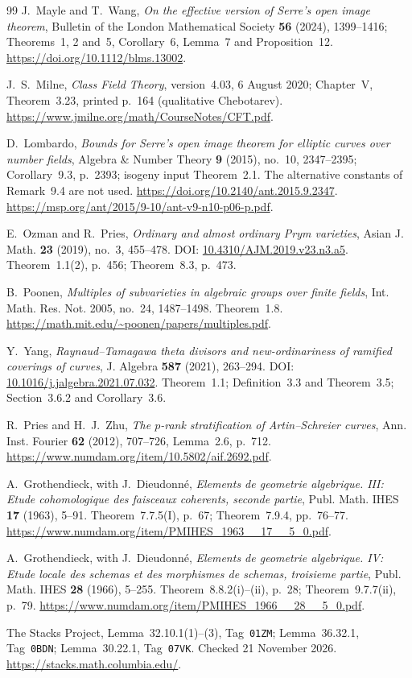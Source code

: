 \begin{thebibliography}{99}
J.~Mayle and T.~Wang, \emph{On the effective version of Serre's
open image theorem}, Bulletin of the London Mathematical Society
\textbf{56} (2024), 1399--1416; Theorems~1, 2 and~5,
Corollary~6, Lemma~7 and Proposition~12.
\url{https://doi.org/10.1112/blms.13002}.

J.~S.~Milne, \emph{Class Field Theory}, version~4.03,
6 August 2020; Chapter~V, Theorem~3.23, printed p.~164
(qualitative Chebotarev).
\url{https://www.jmilne.org/math/CourseNotes/CFT.pdf}.

D.~Lombardo, \emph{Bounds for Serre's open image theorem for elliptic
curves over number fields}, Algebra \& Number Theory \textbf{9}
(2015), no.~10, 2347--2395; Corollary~9.3, p.~2393;
isogeny input Theorem~2.1. The alternative constants of Remark~9.4
are not used.
\url{https://doi.org/10.2140/ant.2015.9.2347}.
\url{https://msp.org/ant/2015/9-10/ant-v9-n10-p06-p.pdf}.

E.~Ozman and R.~Pries,
\emph{Ordinary and almost ordinary Prym varieties},
Asian J. Math. \textbf{23} (2019), no.~3, 455--478.
DOI: \href{https://doi.org/10.4310/AJM.2019.v23.n3.a5}{10.4310/AJM.2019.v23.n3.a5}.
Theorem~1.1(2), p.~456; Theorem~8.3, p.~473.

B.~Poonen,
\emph{Multiples of subvarieties in algebraic groups over finite fields},
Int. Math. Res. Not. 2005, no.~24, 1487--1498.
Theorem~1.8.
\url{https://math.mit.edu/~poonen/papers/multiples.pdf}.

Y.~Yang,
\emph{Raynaud--Tamagawa theta divisors and new-ordinariness of
ramified coverings of curves},
J. Algebra \textbf{587} (2021), 263--294.
DOI: \href{https://doi.org/10.1016/j.jalgebra.2021.07.032}{10.1016/j.jalgebra.2021.07.032}.
Theorem~1.1; Definition~3.3 and Theorem~3.5;
Section~3.6.2 and Corollary~3.6.

R.~Pries and H.~J.~Zhu, \emph{The $p$-rank stratification of
Artin--Schreier curves}, Ann. Inst. Fourier \textbf{62} (2012),
707--726, Lemma~2.6, p.~712.
\url{https://www.numdam.org/item/10.5802/aif.2692.pdf}.

A.~Grothendieck, with J.~Dieudonn\'e, \emph{Elements de geometrie
algebrique. III: Etude cohomologique des faisceaux coherents,
seconde partie}, Publ. Math. IHES \textbf{17} (1963), 5--91.
Theorem~7.7.5(I), p.~67; Theorem~7.9.4, pp.~76--77.
\url{https://www.numdam.org/item/PMIHES_1963__17__5_0.pdf}.

A.~Grothendieck, with J.~Dieudonn\'e, \emph{Elements de geometrie
algebrique. IV: Etude locale des schemas et des morphismes de
schemas, troisieme partie}, Publ. Math. IHES \textbf{28} (1966),
5--255. Theorem~8.8.2(i)--(ii), p.~28; Theorem~9.7.7(ii), p.~79.
\url{https://www.numdam.org/item/PMIHES_1966__28__5_0.pdf}.

The Stacks Project, Lemma~32.10.1(1)--(3), Tag~\texttt{01ZM};
Lemma~36.32.1, Tag~\texttt{0BDN}; Lemma~30.22.1,
Tag~\texttt{07VK}. Checked 21 November 2026.
\url{https://stacks.math.columbia.edu/}.

\end{thebibliography}
